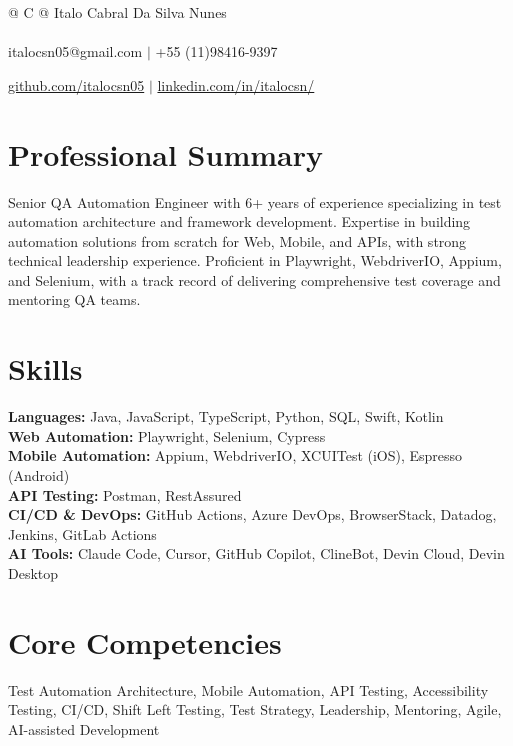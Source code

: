 \documentclass[a4paper,8pt]{article}
\begin{document}
\pagestyle{empty} 


\begin{tabularx}{\linewidth}{@{} C @{}}
\color[HTML]{1C033C} \Huge{Italo Cabral Da Silva Nunes} \\[6pt]
\\
\textcolor[HTML]{371e77}{{{{\faEnvelope} italocsn05@gmail.com}} $|$}
\textcolor[HTML]{371e77}{{{\faMobile} +55 (11)98416-9397}}

\textcolor[HTML]{371e77}{\underline{{\raisebox{-0.05\height}{\faGithub}github.com/italocsn05}} $|$}
\textcolor[HTML]{371e77}{\underline{{\raisebox{-0.05\height}{\faLinkedin}linkedin.com/in/italocsn/}}}
\end{tabularx}

\section{Professional Summary}
\color[HTML]{1C033C}Senior QA Automation Engineer with 6+ years of experience specializing in test automation architecture and framework development. Expertise in building automation solutions from scratch for Web, Mobile, and APIs, with strong technical leadership experience. Proficient in Playwright, WebdriverIO, Appium, and Selenium, with a track record of delivering comprehensive test coverage and mentoring QA teams.

\section{Skills}
\color[HTML]{1C033C}\textbf{Languages:} Java, JavaScript, TypeScript, Python, SQL, Swift, Kotlin\\[3pt]
\color[HTML]{1C033C}\textbf{Web Automation:} Playwright, Selenium, Cypress\\[3pt]
\color[HTML]{1C033C}\textbf{Mobile Automation:} Appium, WebdriverIO, XCUITest (iOS), Espresso (Android)\\[3pt]
\color[HTML]{1C033C}\textbf{API Testing:} Postman, RestAssured\\[3pt]
\color[HTML]{1C033C}\textbf{CI/CD \& DevOps:} GitHub Actions, Azure DevOps, BrowserStack, Datadog, Jenkins, GitLab Actions\\[3pt]
\color[HTML]{1C033C}\textbf{AI Tools:} Claude Code, Cursor, GitHub Copilot, ClineBot, Devin Cloud, Devin Desktop\\[3pt]

\section{Core Competencies}
Test Automation Architecture, Mobile Automation, API Testing, Accessibility Testing, CI/CD, Shift Left Testing, Test Strategy, Leadership, Mentoring, Agile, AI-assisted Development
\end{document}
